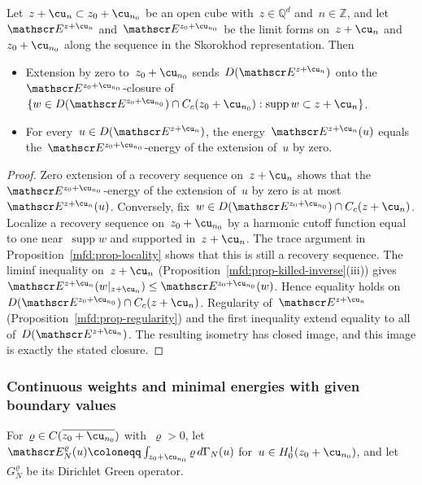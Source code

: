 \documentclass[11pt]{amsart}
\begin{document}
\smallskip

\begin{proposition}
\label{mfd:prop-killed-consistency}
Let~$z+\cu_n\subset z_0+\cu_{n_0}$ be an open cube with~$z\in\mathbb Q^d$ and~$n\in\mathbb Z$, and let~$\mathscr E^{z+\cu_n}$ and~$\mathscr E^{z_0+\cu_{n_0}}$ be the limit forms on~$z+\cu_n$ and~$z_0+\cu_{n_0}$ along the sequence in the Skorokhod representation. Then
\begin{itemize}
\item Extension by zero to~$z_0+\cu_{n_0}$ sends~$D(\mathscr E^{z+\cu_n})$ onto the~$\mathscr E^{z_0+\cu_{n_0}}$-closure of~$\{w\in D(\mathscr E^{z_0+\cu_{n_0}})\cap C_c(z_0+\cu_{n_0}):\operatorname{supp}w\subset z+\cu_n\}$.
\item For every~$u\in D(\mathscr E^{z+\cu_n})$, the energy~$\mathscr E^{z+\cu_n}(u)$ equals the~$\mathscr E^{z_0+\cu_{n_0}}$-energy of the extension of~$u$ by zero.
\end{itemize}
\end{proposition}

\begin{proof}
Zero extension of a recovery sequence on~$z+\cu_n$ shows that the~$\mathscr E^{z_0+\cu_{n_0}}$-energy of the extension of~$u$ by zero is at most~$\mathscr E^{z+\cu_n}(u)$. Conversely, fix~$w\in D(\mathscr E^{z_0+\cu_{n_0}})\cap C_c(z+\cu_n)$. Localize a recovery sequence on~$z_0+\cu_{n_0}$ by a harmonic cutoff function equal to one near~$\operatorname{supp}w$ and supported in~$z+\cu_n$. The trace argument in Proposition~\ref{mfd:prop-locality} shows that this is still a recovery sequence. The liminf inequality on~$z+\cu_n$ (Proposition~\ref{mfd:prop-killed-inverse}(iii)) gives~$\mathscr E^{z+\cu_n}(w|_{z+\cu_n})\leq \mathscr E^{z_0+\cu_{n_0}}(w)$. Hence equality holds on~$D(\mathscr E^{z_0+\cu_{n_0}})\cap C_c(z+\cu_n)$. Regularity of~$\mathscr E^{z+\cu_n}$ (Proposition~\ref{mfd:prop-regularity}) and the first inequality extend equality to all of~$D(\mathscr E^{z+\cu_n})$. The resulting isometry has closed image, and this image is exactly the stated closure.
\end{proof}

\subsubsection{Continuous weights and minimal energies with given boundary values}

For~$\varrho\in C(\overline{z_0+\cu_{n_0}})$ with~$\varrho>0$, let~$\mathscr E_N^{\varrho}(u)\coloneqq\int_{z_0+\cu_{n_0}}\varrho\,d\Gamma_N(u)$ for~$u\in H^1_0(z_0+\cu_{n_0})$, and let~$G_N^{\varrho}$ be its Dirichlet Green operator.
\end{document}
